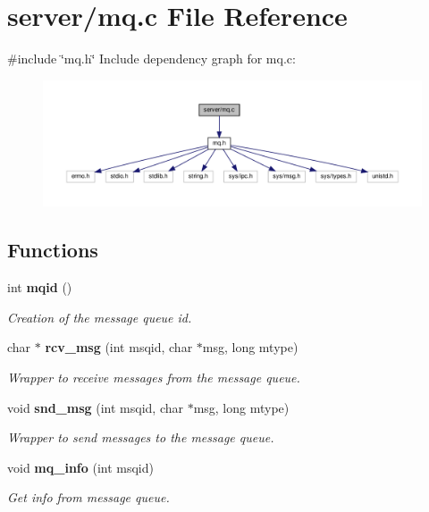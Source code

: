 \section{server/mq.c File Reference}
\label{mq_8c}
{\ttfamily \#include \char`\"{}mq.\+h\char`\"{}}\newline
Include dependency graph for mq.\+c\+:\nopagebreak
\begin{figure}[H]
\begin{center}
\leavevmode
\includegraphics[width=350pt]{mq_8c__incl}
\end{center}
\end{figure}
\subsection*{Functions}
\begin{DoxyCompactItemize}
\item 
int \textbf{ mqid} ()
\begin{DoxyCompactList}\small\item\em Creation of the message queue id. \end{DoxyCompactList}\item 
char $\ast$ \textbf{ rcv\+\_\+msg} (int msqid, char $\ast$msg, long mtype)
\begin{DoxyCompactList}\small\item\em Wrapper to receive messages from the message queue. \end{DoxyCompactList}\item 
void \textbf{ snd\+\_\+msg} (int msqid, char $\ast$msg, long mtype)
\begin{DoxyCompactList}\small\item\em Wrapper to send messages to the message queue. \end{DoxyCompactList}\item 
void \textbf{ mq\+\_\+info} (int msqid)
\begin{DoxyCompactList}\small\item\em Get info from message queue. \end{DoxyCompactList}\end{DoxyCompactItemize}


